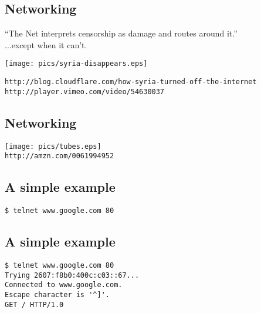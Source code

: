 \documentclass[xga]{xdvislides}
\begin{document}
\subsection{Networking}
``The Net interprets censorship as damage and routes around it.'' \\

...except when it can't.

\begin{center}
\vspace*{\fill}
	\texttt{[image: pics/syria-disappears.eps]} \\
\vspace*{\fill}

{\tt http://blog.cloudflare.com/how-syria-turned-off-the-internet} \\
{\tt http://player.vimeo.com/video/54630037}
\end{center}

\subsection{Networking}
\begin{center}
\vspace*{\fill}
	\texttt{[image: pics/tubes.eps]} \\
\vspace*{\fill}
{\tt http://amzn.com/0061994952}
\end{center}





\subsection{A simple example}
\Hugesize
\begin{center}
\begin{verbatim}
$ telnet www.google.com 80

\end{verbatim}
\end{center}
\Normalsize
\vspace*{\fill}

\subsection{A simple example}
\Hugesize
\begin{center}
\begin{verbatim}
$ telnet www.google.com 80
Trying 2607:f8b0:400c:c03::67...
Connected to www.google.com.
Escape character is '^]'.
GET / HTTP/1.0

\end{verbatim}
\end{center}
\Normalsize
\vspace*{\fill}
\end{document}
